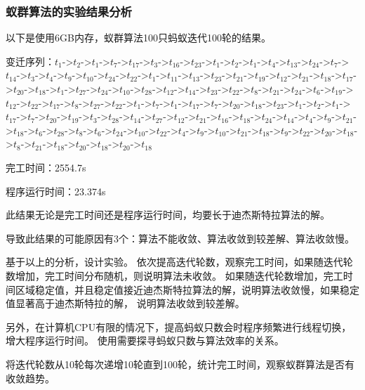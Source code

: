 \subsubsection{蚁群算法的实验结果分析}
以下是使用6GB内存，蚁群算法100只蚂蚁迭代100轮的结果。

变迁序列：$t_{1}$->$t_{2}$->$t_{1}$->$t_{7}$->$t_{17}$->$t_{3}$->$t_{16}$->$t_{23}$->$t_{1}$->$t_{2}$->$t_{1}$->$t_{4}$->$t_{13}$->$t_{24}$->$t_{7}$->$t_{14}$->$t_{3}$->$t_{4}$->$t_{9}$->$t_{10}$->$t_{24}$->$t_{22}$->$t_{1}$->$t_{11}$->$t_{13}$->$t_{23}$->$t_{21}$->$t_{19}$->$t_{12}$->$t_{21}$->$t_{18}$->$t_{17}$->$t_{20}$->$t_{18}$->$t_{1}$->$t_{27}$->$t_{24}$->$t_{10}$->$t_{28}$->$t_{12}$->$t_{14}$->$t_{23}$->$t_{22}$->$t_{8}$->$t_{21}$->$t_{24}$->$t_{6}$->$t_{19}$->$t_{12}$->$t_{22}$->$t_{17}$->$t_{8}$->$t_{27}$->$t_{22}$->$t_{1}$->$t_{7}$->$t_{1}$->$t_{17}$->$t_{7}$->$t_{20}$->$t_{18}$->$t_{23}$->$t_{1}$->$t_{2}$->$t_{1}$->$t_{17}$->$t_{7}$->$t_{20}$->$t_{19}$->$t_{3}$->$t_{28}$->$t_{14}$->$t_{27}$->$t_{12}$->$t_{21}$->$t_{16}$->$t_{18}$->$t_{24}$->$t_{14}$->$t_{4}$->$t_{9}$->$t_{21}$->$t_{18}$->$t_{6}$->$t_{28}$->$t_{8}$->$t_{6}$->$t_{24}$->$t_{10}$->$t_{22}$->$t_{4}$->$t_{9}$->$t_{10}$->$t_{21}$->$t_{18}$->$t_{9}$->$t_{22}$->$t_{20}$->$t_{18}$->$t_{8}$->$t_{21}$->$t_{18}$->$t_{20}$->$t_{18}$->$t_{20}$->$t_{18}$

完工时间：2554.7s

程序运行时间：23.374s

此结果无论是完工时间还是程序运行时间，均要长于迪杰斯特拉算法的解。

导致此结果的可能原因有3个：算法不能收敛、算法收敛到较差解、算法收敛慢。

基于以上的分析，设计实验。
依次提高迭代轮数，观察完工时间，如果随迭代轮数增加，完工时间分布随机，则说明算法未收敛。
如果随迭代轮数增加，完工时间区域稳定值，并且稳定值接近迪杰斯特拉算法的解，说明算法收敛慢，如果稳定值显著高于迪杰斯特拉的解，
说明算法收敛到较差解。

另外，在计算机CPU有限的情况下，提高蚂蚁只数会时程序频繁进行线程切换，增大程序运行时间。
使用需要探寻蚂蚁只数与算法效率的关系。

将迭代轮数从10轮每次递增10轮直到100轮，统计完工时间，观察蚁群算法是否有收敛趋势。

\begin{table}[H]
	\centering
	\caption{蚁群算法迭代轮数与完工时间的关系}
\end{table}

